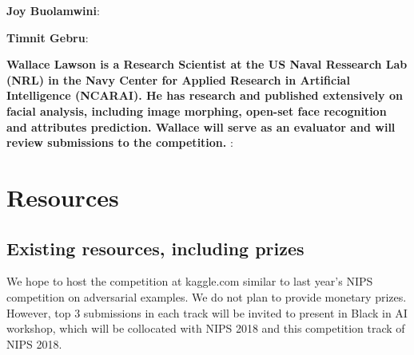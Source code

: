 \documentclass[11pt, oneside]{article}
\begin{document}
{\bf Joy Buolamwini}: 

{\bf Timnit Gebru}:

{\bf Wallace Lawson is a Research Scientist at the US Naval Ressearch Lab (NRL) in the Navy Center for Applied Research in Artificial Intelligence (NCARAI).  He has research and published extensively on facial analysis, including image morphing, open-set face recognition and attributes prediction.  Wallace will serve as an evaluator and will review submissions to the competition. }:



\section{Resources}
\subsection{Existing resources, including prizes}

We hope to host the competition at kaggle.com similar to last year's NIPS competition on adversarial examples. We do not plan to provide monetary prizes. However, top 3 submissions in each track will be invited to present in Black in AI workshop, which will be collocated with NIPS 2018 and this competition track of NIPS 2018.



%

\end{document}
